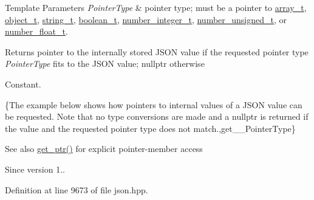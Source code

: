\begin{DoxyTemplParams}{Template Parameters}
{\em Pointer\+Type} & pointer type; must be a pointer to \hyperlink{classnlohmann_1_1basic__json_a4c409f1b6d9caf3412c78af9a5883fed}{array\+\_\+t}, \hyperlink{classnlohmann_1_1basic__json_a3cdea044cc3ecba1c4f9874a89daf6e4}{object\+\_\+t}, \hyperlink{classnlohmann_1_1basic__json_a61f8566a1a85a424c7266fb531dca005}{string\+\_\+t}, \hyperlink{classnlohmann_1_1basic__json_a4c919102a9b4fe0d588af64801436082}{boolean\+\_\+t}, \hyperlink{classnlohmann_1_1basic__json_a98e611d67b7bd75307de99c9358ab2dc}{number\+\_\+integer\+\_\+t}, \hyperlink{classnlohmann_1_1basic__json_ab906e29b5d83ac162e823ada2156b989}{number\+\_\+unsigned\+\_\+t}, or \hyperlink{classnlohmann_1_1basic__json_a88d6103cb3620410b35200ee8e313d97}{number\+\_\+float\+\_\+t}.\\
\hline
\end{DoxyTemplParams}
\begin{DoxyReturn}{Returns}
pointer to the internally stored J\+S\+ON value if the requested pointer type {\itshape Pointer\+Type} fits to the J\+S\+ON value; {\ttfamily nullptr} otherwise
\end{DoxyReturn}
Constant.

\{The example below shows how pointers to internal values of a J\+S\+ON value can be requested. Note that no type conversions are made and a {\ttfamily nullptr} is returned if the value and the requested pointer type does not match.,get\+\_\+\+\_\+\+Pointer\+Type\}

\begin{DoxySeeAlso}{See also}
\hyperlink{classnlohmann_1_1basic__json_aefa46bd2d96bb77a38d1c8b431eab44f}{get\+\_\+ptr()} for explicit pointer-\/member access
\end{DoxySeeAlso}
\begin{DoxySince}{Since}
version 1.. 
\end{DoxySince}


Definition at line 9673 of file json.\+hpp.

